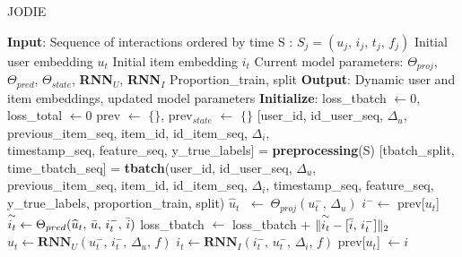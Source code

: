 \begin{algorithm}[H]
    \caption{JODIE}
    \begin{algorithmic} 
        \STATE \textbf{Input}: Sequence of interactions ordered by time S : $S_j = (u_j,\,i_j,\,t_j,\,f_j)$
        \STATE \quad \hspace{0.73cm}Initial user embedding $u_t$
        \STATE \quad \hspace{0.73cm}Initial item embedding $i_t$
        \STATE \quad \hspace{0.73cm}Current model parameters: $\Theta_{proj}$, $\Theta_{pred}$, $\Theta_{state}$, \textbf{RNN}$_U$, \textbf{RNN}$_I$
        \STATE \quad \hspace{0.73cm}Proportion\_train, split
        \STATE \textbf{Output}: Dynamic user and item embeddings, updated model parameters
        \STATE \textbf{Initialize}: loss\_tbatch $\leftarrow 0$, loss\_total $\leftarrow 0$
        \STATE \quad \hspace{1.2cm} prev $\leftarrow$ $\{\}$, prev$_{state}$ $\leftarrow$ $\{\}$
        \STATE \quad \hspace{1.2cm} [user\_id, id\_user\_seq, $\Delta_u$, previous\_item\_seq, item\_id, id\_item\_seq, $\Delta_i$,\\
        \quad \hspace{1.2cm} timestamp\_seq, feature\_seq, y\_true\_labels] = \textbf{preprocessing}(S)
        \STATE \quad \hspace{1.2cm} [tbatch\_split, time\_tbatch\_seq] = \textbf{tbatch}(user\_id, id\_user\_seq, $\Delta_u$,\\
        \quad \hspace{1.2cm} previous\_item\_seq, item\_id, id\_item\_seq, $\Delta_i$, timestamp\_seq, feature\_seq,\\
        \quad \hspace{1.2cm} y\_true\_labels, proportion\_train, split)
                \STATE $\widehat u_t$ $\; \leftarrow \; \Theta_{proj}(u_t^-, \, \Delta_u)$
                \STATE $i^- \leftarrow$ prev[$u_t$]
                \STATE $\overset{\sim}{i_t} \leftarrow \Theta_{pred}(\widehat u_t, \, \Bar{u}, \, i^-_t, \,\Bar{i})$
                \STATE loss\_tbatch $\leftarrow$ loss\_tbatch + $\| \overset{\sim}{i_t} - [ \Bar{i}, \, i_t^-] \|_2$
                \STATE $u_t \leftarrow \textbf{RNN}_U(u_t^-,\,i_t^-,\,\Delta_u,\,f)$
                \STATE $i_t \leftarrow \textbf{RNN}_I(i_t^-,\,u_t^-,\,\Delta_i,\,f)$
                \STATE prev[$u_t$] $\leftarrow i$

\end{algorithmic}
\end{algorithm}
